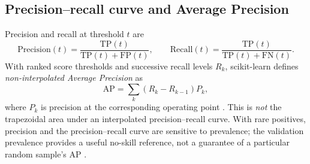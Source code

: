 \documentclass[11pt,a4paper]{article}
\begin{document}
\subsection{Precision--recall curve and Average Precision}
Precision and recall at threshold $t$ are
\begin{equation}\label{eq:pr}\mathrm{Precision}(t)=\frac{\mathrm{TP}(t)}{\mathrm{TP}(t)+\mathrm{FP}(t)},\qquad \mathrm{Recall}(t)=\frac{\mathrm{TP}(t)}{\mathrm{TP}(t)+\mathrm{FN}(t)}.\end{equation}
With ranked score thresholds and successive recall levels $R_k$, scikit-learn defines \emph{non-interpolated Average Precision} as
\begin{equation}\label{eq:ap}\mathrm{AP}=\sum_k(R_k-R_{k-1})P_k,\end{equation}
where $P_k$ is precision at the corresponding operating point \cite{skap}. This is \emph{not} the trapezoidal area under an interpolated precision--recall curve. With rare positives, precision and the precision--recall curve are sensitive to prevalence; the validation prevalence provides a useful no-skill reference, not a guarantee of a particular random sample's AP \cite{saito2015}.
\end{document}
